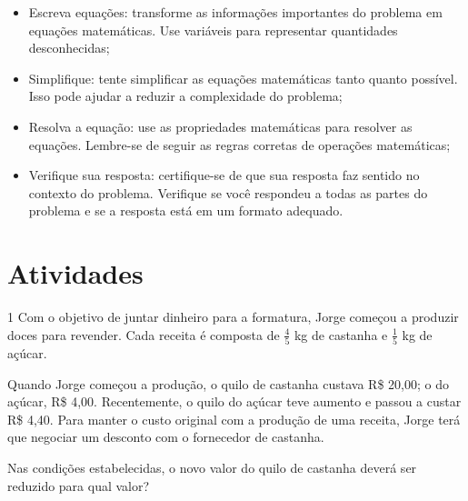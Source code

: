 {\begin{itemize}
  \item Escreva equações: transforme as informações importantes do
problema em equações matemáticas. Use variáveis para representar
quantidades desconhecidas;

  \item Simplifique: tente simplificar as equações matemáticas tanto
quanto possível. Isso pode ajudar a reduzir a complexidade do problema;

  \item Resolva a equação: use as propriedades matemáticas para resolver
as equações. Lembre-se de seguir as regras corretas de operações
matemáticas;

  \item Verifique sua resposta: certifique-se de que sua resposta faz
sentido no contexto do problema. Verifique se você respondeu a todas as
partes do problema e se a resposta está em um formato adequado.
\end{itemize}
}

\section*{Atividades}

\num{1} Com o objetivo de juntar dinheiro para a formatura, Jorge começou a
produzir doces para revender. Cada receita é composta de $\frac{4}{5}$ kg de 
castanha e $\frac{1}{5}$ kg de açúcar.

Quando Jorge começou a produção, o quilo de castanha custava R\$ 20,00; o do
açúcar, R\$ 4,00. Recentemente, o quilo do açúcar teve aumento e passou a
custar R\$ 4,40. Para manter o custo original com a produção de uma receita, 
Jorge terá que negociar um desconto com o fornecedor de castanha.

Nas condições estabelecidas, o novo valor do quilo de castanha deverá ser
reduzido para qual valor?

\begin{emptybox}
\end{emptybox}

